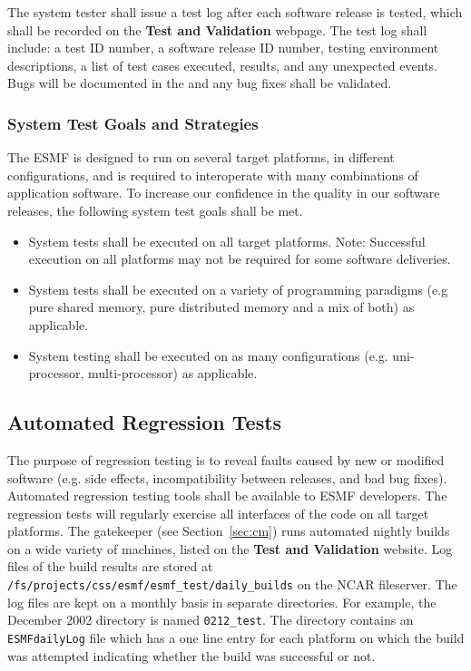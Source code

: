 The system tester shall issue a test log after each software release is tested,
which shall be recorded on the {\bf Test and Validation} webpage. The test 
log shall
include: a test ID number, a software release ID number, testing environment 
descriptions, a list of test cases executed, results, and any unexpected 
events. Bugs will be documented in the  and 
any bug fixes shall be validated.

\subsubsection{System Test Goals and Strategies}

The ESMF is designed to run on several target platforms, in different 
configurations, and is required to interoperate with many combinations 
of application software. To increase our confidence in the quality in 
our software releases, the following system test goals shall be met.

\begin{itemize}
\item System tests shall be executed on all target platforms. Note: Successful
execution on all platforms may not be required for some software deliveries.
\item System tests shall be executed on a variety of programming paradigms
(e.g pure shared memory, pure distributed memory and a mix of both) as
applicable.
\item System testing shall be executed on as many configurations (e.g. uni-processor,
multi-processor) as applicable.
\end{itemize}

\subsection{Automated Regression Tests}

The purpose of regression testing is to reveal faults caused by new
or modified software (e.g. side effects, incompatibility between 
releases, and bad bug fixes).  Automated regression testing tools shall 
be available to ESMF developers.  
The regression tests will regularly exercise all interfaces of the code on 
all target platforms.  The gatekeeper (see Section~\ref{sec:cm}) runs 
automated nightly builds on a wide variety of machines, listed on the
{\bf Test and Validation} website. 
Log files of the build results are stored at {\tt /fs/projects/css/esmf/esmf\_test/daily\_builds} on the NCAR fileserver. 
The log files are kept on a monthly basis in 
separate directories. For example, the December 2002 directory is named {\tt 0212\_test}. The 
directory contains an {\tt ESMFdailyLog} file which has a one line entry for each platform on 
which the build was attempted indicating whether the build was successful or not. 


